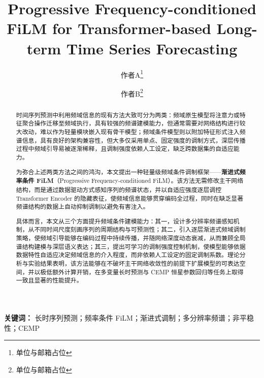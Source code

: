 \documentclass[UTF8,a4paper,11pt]{ctexart}
\title{Progressive Frequency-conditioned FiLM for Transformer-based Long-term Time Series Forecasting}
\author{作者A\thanks{单位与邮箱占位} \and 作者B\thanks{单位与邮箱占位}}
\date{} %
\begin{document}
\maketitle

%
%

\begin{abstract}
时间序列预测中利用频域信息的现有方法大致可分为两类：频域原生模型将注意力或特征聚合操作迁移至频域执行，具有较强的频谱建模能力，但通常需要对网络结构进行较大改动，难以作为轻量模块嵌入现有骨干模型；频域条件模型则以附加特征形式注入频谱信息，具有良好的架构兼容性，但大多仅采用单点、固定强度的调制方式，深层传播过程中频域引导易被逐渐稀释，且调制强度依赖人工设定，缺乏跨数据集的自适应能力。

为弥合上述两类方法之间的鸿沟，本文提出一种轻量级频域条件调制框架——\textbf{渐进式频率条件 FiLM}（Progressive Frequency-conditioned FiLM）。该方法无需修改主干网络结构，而是通过数据驱动方式感知序列的频谱状态，并以自适应强度逐层调控 Transformer Encoder 的隐藏表征，使频域信息能够贯穿编码全过程，同时在缺乏显著频谱结构的数据上自动抑制调制以避免有害注入。

具体而言，本文从三个方面提升频域条件建模能力：其一，设计多分辨率频谱感知机制，从不同时间尺度刻画序列的周期结构与可预测性；其二，引入逐层渐进式频域调制策略，使频域引导能够在编码过程中持续传播，并随网络深度动态衰减，从而兼顾全局谱结构建模与深层语义表达；其三，提出可学习的调制强度控制机制，使模型能够依据数据特性自适应决定频域信息的介入程度，而非依赖人工设定的固定调制系数。理论分析与实验结果表明，该方法能够在不破坏主干网络收敛性的前提下扩展模型的可表达空间，并以极低额外计算开销，在多变量长时预测与 CEMP 恒星参数回归等任务上取得一致且显著的性能提升。
\end{abstract}

\noindent\textbf{关键词：} 长时序列预测；频率条件 FiLM；渐进式调制；多分辨率频谱；非平稳性；CEMP










\appendix

\end{document}
